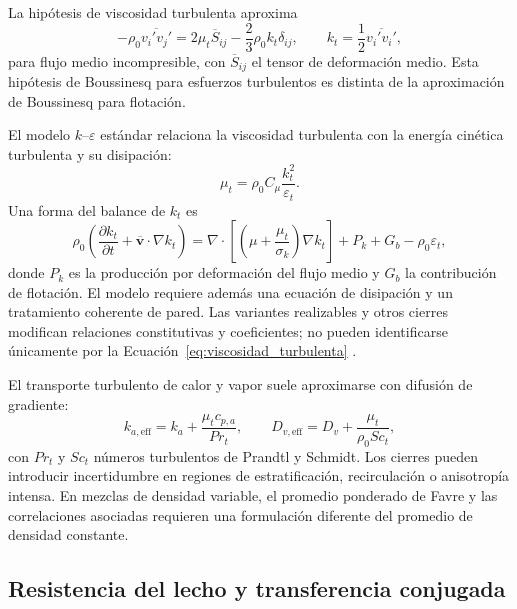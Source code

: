 La hipótesis de viscosidad turbulenta aproxima
\begin{equation}
-\rho_0\overline{v_i'v_j'}
=2\mu_t\overline S_{ij}
-\frac{2}{3}\rho_0k_t\delta_{ij},
\qquad
k_t=\frac12\overline{v_i'v_i'},
\label{eq:cierre_reynolds}
\end{equation}
para flujo medio incompresible, con $\overline S_{ij}$ el tensor de deformación medio. Esta hipótesis de Boussinesq para esfuerzos turbulentos es distinta de la aproximación de Boussinesq para flotación.

El modelo $k$--$\varepsilon$ estándar relaciona la viscosidad turbulenta con la energía cinética turbulenta y su disipación:
\begin{equation}
\mu_t=\rho_0C_\mu\frac{k_t^2}{\varepsilon_t}.
\label{eq:viscosidad_turbulenta}
\end{equation}
Una forma del balance de $k_t$ es
\begin{equation}
\rho_0\left(\frac{\partial k_t}{\partial t}
+\overline{\mathbf v}\cdot\nabla k_t\right)
=\nabla\cdot\left[\left(\mu+\frac{\mu_t}{\sigma_k}\right)\nabla k_t\right]
+P_k+G_b-\rho_0\varepsilon_t,
\label{eq:balance_k_turbulento}
\end{equation}
donde $P_k$ es la producción por deformación del flujo medio y $G_b$ la contribución de flotación. El modelo requiere además una ecuación de disipación y un tratamiento coherente de pared. Las variantes realizables y otros cierres modifican relaciones constitutivas y coeficientes; no pueden identificarse únicamente por la Ecuación~\eqref{eq:viscosidad_turbulenta} \cite{launder1974}.

El transporte turbulento de calor y vapor suele aproximarse con difusión de gradiente:
\begin{equation}
k_{a,\mathrm{eff}}=k_a+\frac{\mu_tc_{p,a}}{Pr_t},
\qquad
D_{v,\mathrm{eff}}=D_v+\frac{\mu_t}{\rho_0Sc_t},
\label{eq:difusion_turbulenta}
\end{equation}
con $Pr_t$ y $Sc_t$ números turbulentos de Prandtl y Schmidt. Los cierres pueden introducir incertidumbre en regiones de estratificación, recirculación o anisotropía intensa. En mezclas de densidad variable, el promedio ponderado de Favre y las correlaciones asociadas requieren una formulación diferente del promedio de densidad constante.

\subsection{Resistencia del lecho y transferencia conjugada}

